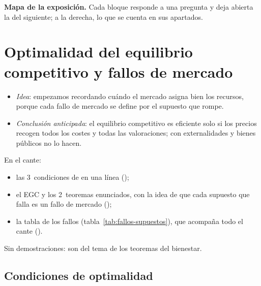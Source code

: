 \documentclass[11pt]{article}
\begin{document}
\begin{anotaciones}
\textbf{Mapa de la exposición.} Cada bloque responde a una pregunta y deja abierta la del siguiente; a la derecha, lo que se cuenta en sus apartados.
\begin{infografiacaja}
\caption{Mapa de la exposición: la pregunta de cada bloque y el hilo que los une}\label{figu:mapa-tema}
\end{infografiacaja}
\end{anotaciones}



\section{Optimalidad del equilibrio competitivo\cortetitulo{} y fallos de mercado}\label{sec:optimalidad-fallos}

\begin{itemize}
\item \emph{Idea}: empezamos recordando cuándo el mercado asigna bien los recursos, porque cada fallo de mercado se define por el supuesto que rompe.
\item \emph{Conclusión anticipada}: el equilibrio competitivo es eficiente solo si los precios recogen todos los costes y todas las valoraciones; con externalidades y bienes públicos no lo hacen.
\end{itemize}

\begin{notaopositor}
En el cante:
\begin{itemize}
\item las 3~condiciones de  en una línea ();
\item el EGC y los 2~teoremas enunciados, con la idea de que cada supuesto que falla es un fallo de mercado ();
\item la tabla de los fallos (tabla~\ref{tab:fallos-supuestos}), que acompaña todo el cante ().
\end{itemize}
Sin demostraciones: son del tema de los teoremas del bienestar.
\end{notaopositor}

\subsection{Condiciones de optimalidad}\label{sec:condiciones-optimalidad}
\end{document}

